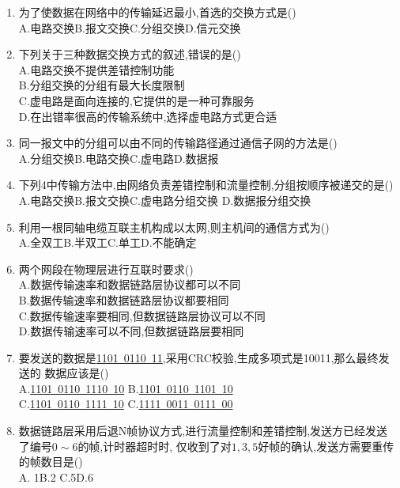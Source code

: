 \documentclass[12pt, a4paper, oneside, UTF8]{ctexbook}
\begin{document}
\begin{enumerate}
    \item 为了使数据在网络中的传输延迟最小,首选的交换方式是() \\
    A.电路交换\qquad B.报文交换\qquad C.分组交换\qquad D.信元交换 
    
    \item 下列关于三种数据交换方式的叙述,错误的是() \\
    A.电路交换不提供差错控制功能 \\
    B.分组交换的分组有最大长度限制 \\
    C.虚电路是面向连接的,它提供的是一种可靠服务 \\
    D.在出错率很高的传输系统中,选择虚电路方式更合适 

    \item 同一报文中的分组可以由不同的传输路径通过通信子网的方法是()  \\
    A.分组交换\qquad B.电路交换\qquad C.虚电路\qquad D.数据报

    \item 下列4中传输方法中,由网络负责差错控制和流量控制,分组按顺序被递交的是() \\
    A.电路交换\qquad B.报文交换\qquad C.虚电路分组交换 \qquad D.数据报分组交换 

    \item 利用一根同轴电缆互联主机构成以太网,则主机间的通信方式为() \\
    A.全双工\qquad B.半双工\qquad C.单工\qquad D.不能确定

    \item 两个网段在物理层进行互联时要求() \\
    A.数据传输速率和数据链路层协议都可以不同 \\
    B.数据传输速率和数据链路层协议都要相同 \\
    C.数据传输速率要相同,但数据链路层协议可以不同 \\
    D.数据传输速率可以不同,但数据链路层要相同

    \item \bl[2] 要发送的数据是\underline{1101\ 0110\ 11},采用CRC校验,生成多项式是10011,那么最终发送的
    数据应该是() \\
    A.\underline{1101\ 0110\ 1110\ 10} \qquad B.\underline{1101\ 0110\ 1101\ 10}  \\
    C.\underline{1101\ 0110\ 1111\ 10} \qquad C.\underline{1111\ 0011\ 0111\ 00}
    


    \item 数据链路层采用后退N帧协议方式,进行流量控制和差错控制,发送方已经发送了编号$0\sim 6$的帧,计时器超时时,
    仅收到了对$1,3,5$好帧的确认,发送方需要重传的帧数目是() \\
    A. 1\qquad B.2 \qquad C.5\qquad D.6


\end{enumerate}
\end{document}
